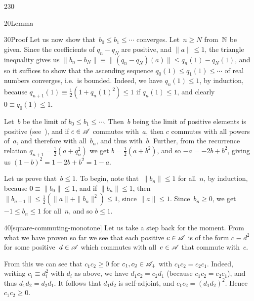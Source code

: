 \begin{parsec}{230}
\begin{point}{20}{Lemma}
\begin{point}{30}{Proof}
Let us now show that~$b_0\leq b_1\leq \dotsb$ converges.
Let~$n\geq N$ from~$\mathbb{N}$ be given.
Since the coefficients of $q_n-q_N$ are positive,
and $\|a\|\leq 1$,
the triangle inequality gives us
$\|b_n-b_N\|\equiv \|(q_n-q_N)(a)\|\leq q_n(1)-q_N(1)$,
and
so it suffices to 
show that the ascending sequence
 $q_0(1)\leq q_1(1)\leq \dotsb$
of real numbers
converges,
i.e.~is bounded.
Indeed,
we have $q_n(1)\leq 1$,
by induction,
because $q_{n+1}(1)\equiv \frac{1}{2}(1+q_n(1)^2)
\leq 1$ if $q_n(1)\leq 1$,
and clearly $0\equiv q_0(1)\leq 1$.

Let~$b$ be the limit of $b_0\leq b_1\leq\dotsb$.
Then~$b$ being the limit of positive elements
is positive
(see~),
and if $c\in \mathscr{A}$ commutes with~$a$,
then $c$ commutes with all powers of~$a$,
and therefore with all~$b_n$,
and thus with~$b$.
Further, 
from the recurrence relation $q_{n+1} = \frac{1}{2}(a+q_n^2)$
we get $b=\frac{1}{2}(a+b^2)$,
and so $-a = -2b+b^2$, 
giving us  $(1-b)^2 = 1-2b+b^2 = 1-a$.

Let us prove that~$b\leq 1$.
To begin, note that~$\|b_n\|\leq 1$ for all~$n$, by induction,
because $0\equiv \|b_0\|\leq 1$,
and if $\|b_n\|\leq 1$, then $\|b_{n+1}\|\leq \frac{1}{2}(\|a\|+\|b_n\|^2)
\leq 1$, since $\|a\|\leq 1$.
Since~$b_n\geq 0$, we get $-1\leq b_n\leq 1$ for all~$n$,
and so $b\leq 1$.
\begin{point}{40}[square-commuting-monotone]%
Let us take a step back for the moment.
From what we have proven so far
we see that each positive $c\in\mathscr{A}$
is of the form $c\equiv d^2$ for some positive~$d\in\mathscr{A}$
which commutes with all~$e\in \mathscr{A}$ that commute with~$c$.

From this we can see that $c_1c_2\geq 0$
for  
 $c_1,c_2 \in\mathscr{A}_{+}$
with $c_1c_2 = c_2c_1$.
Indeed, writing $c_i\equiv d_i^2$ with $d_i$ as above,
we have $d_1c_2=c_2d_1$ (because $c_1c_2=c_2c_1$), and thus 
$d_1d_2=d_2d_1$. It follows that $d_1d_2$ is self-adjoint,
and $c_1c_2 = (d_1d_2)^2$. Hence $c_1c_2\geq 0$.


\end{point}
\end{point}
\end{point}
\end{parsec}

